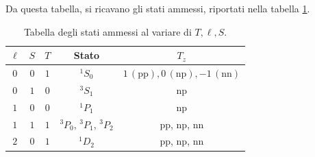 \documentclass[11pt, a4paper]{scrartcl}
\theoremstyle{style}
\numberwithin{equation}{subsection}
\begin{document}
\noindent Da questa tabella, si ricavano gli stati ammessi, riportati nella tabella \ref{tabbb}.
\begin{table}[htpb]
	\centering
	\begin{tabular}{c c c | c c}
		$\ell $ & $S$ & $T$ & Stato & $T_z$\\
	\hline
		$0$ & $0$ & $1$ & $^{1}S_0$ & $1\, (\text{pp}),0\, (\text{np}),-1\, (\text{nn})$\\
		$0$ & $1$ & $0$ & $^{3}S_1$ & np\\
		$1$ & $0$ & $0$ & $^{1}P_1$ & np\\
		$1$ & $1$ & $1$ & $^{3}P_0,\, ^{3}P_1, \, ^{3}P_2$ & pp, np, nn\\
		$2$ & $0$ & $1$ & $^{1}D_2$ & pp, np, nn\\
	\end{tabular}
	\caption{Tabella degli stati ammessi al variare di $T,\ell ,S$.}
	\label{tabbb}
\end{table}
\end{document}
